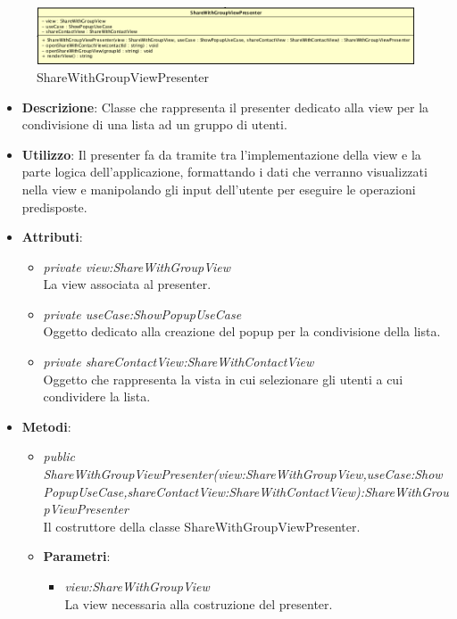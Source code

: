 \label{ShareWithGroupViewPresenter}
\begin{figure}[ht]
	\centering
	\includegraphics[scale=0.5]{Sezioni/SottosezioniST/img/app/ShareWithGroupViewPresenter.png}
	\caption{ShareWithGroupViewPresenter}
\end{figure}

\begin{itemize}
\item \textbf{Descrizione}: Classe che rappresenta il presenter dedicato alla view per la condivisione di una lista ad un gruppo di utenti.
\item \textbf{Utilizzo}: Il presenter fa da tramite tra l'implementazione della view e la parte logica dell'applicazione, formattando i dati che verranno visualizzati nella view e manipolando gli input dell'utente per eseguire le operazioni predisposte.
\item \textbf{Attributi}: 
	\begin{itemize}
	\item \textit{private view:ShareWithGroupView}\\
			La view associata al presenter.
	\item \textit{private useCase:ShowPopupUseCase}\\
		Oggetto dedicato alla creazione del popup per la condivisione della lista.
	\item \textit{private shareContactView:ShareWithContactView}\\
		Oggetto che rappresenta la vista in cui selezionare gli utenti a cui condividere la lista.
	\end{itemize} 
\item \textbf{Metodi}:
	\begin{itemize}
	\item \textit{public ShareWithGroupViewPresenter(view:ShareWithGroupView,useCase:ShowPopupUseCase,shareContactView:ShareWithContactView):ShareWithGroupViewPresenter}\\
	Il costruttore della classe ShareWithGroupViewPresenter.
			\item{\textbf{Parametri}: \begin{itemize}
			\item \textit{view:ShareWithGroupView}\\
			La view necessaria alla costruzione del presenter.

\end{itemize}}
\end{itemize}
\end{itemize}
